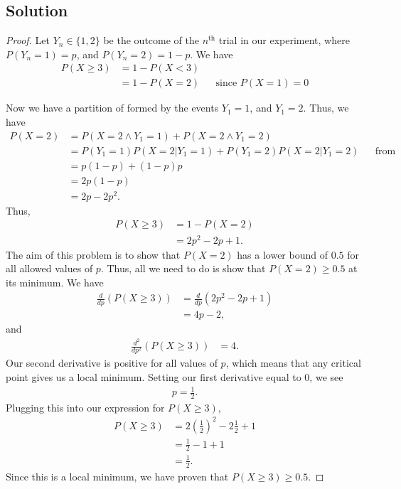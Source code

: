\documentclass[10pt,a4paper]{article}
\theoremstyle{theorem}
\theoremstyle{definition}
\begin{document}
\subsection*{Solution}
\begin{proof}
Let $Y_n \in \{1, 2\}$ be the outcome of the $n^{\text{th}}$ trial in our experiment, where $P(Y_n = 1) = p$, and $P(Y_n = 2) = 1 - p$.  We have
\begin{align*}
P(X \geq 3) &= 1 - P(X < 3)\\
&= 1 - P(X = 2) && \text{since } P(X = 1) = 0
\end{align*}

Now we have a partition of formed by the events $Y_1 = 1$, and $Y_1 = 2$. Thus, we have
\begin{align*}
P(X = 2) &= P(X = 2 \land Y_1 = 1) + P(X = 2 \land Y_1 = 2)\\
&= P(Y_1 = 1) P(X = 2| Y_1 = 1) + P(Y_1 = 2) P(X = 2| Y_1 = 2) && \text{from definition of conditional probability}\\
&= p(1-p) + (1 - p) p\\
&= 2p(1 - p)\\
&= 2p - 2p^2.
\end{align*}
Thus,
\begin{align*}
P(X \geq 3) & =  1 - P(X = 2)\\
&= 2p^2 - 2p + 1.
\end{align*}
The aim of this problem is to show that $P(X = 2)$ has a lower bound of $0.5$ for all allowed values of $p$. Thus, all we need to do is show that $P(X = 2) \geq 0.5$ at its minimum. We have
\begin{align*}
\frac{d}{d p}(P(X \geq 3)) &= \frac{d}{d p}(2p^2 - 2p + 1)\\
&= 4p - 2,
\end{align*}
and
\begin{align*}
\frac{d^2}{d p^2}(P(X \geq 3)) &= 4.
\end{align*}
Our second derivative is positive for all values of $p$, which means that any critical point gives us a local minimum. Setting our first derivative equal to $0$, we see
\begin{align*}
p = \frac{1}{2}.
\end{align*}
Plugging this into our expression for $P(X \geq 3)$, 
\begin{align*}
P(X \geq 3) &= 2(\frac{1}{2})^2 - 2 \frac{1}{2} + 1\\
&= \frac{1}{2} - 1 + 1\\
&= \frac{1}{2}.
\end{align*}
Since this is a local minimum, we have proven that $P(X \geq 3) \geq 0.5$.
\end{proof}
\end{document}
